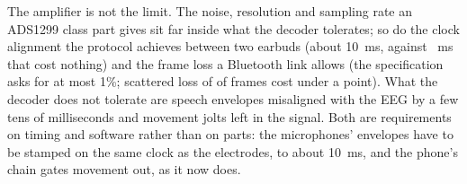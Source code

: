 The amplifier is not the limit. The noise, resolution and sampling rate an ADS1299 class part gives sit far inside what the decoder tolerates; so do the clock alignment the protocol achieves between two earbuds (about 10~ms, against \hwSkewHolds~ms that cost nothing) and the frame loss a Bluetooth link allows (the specification asks for at most 1\%; scattered loss of \hwLossHolds{} of frames cost under a point). What the decoder does not tolerate are speech envelopes misaligned with the EEG by a few tens of milliseconds and movement jolts left in the signal. Both are requirements on timing and software rather than on parts: the microphones' envelopes have to be stamped on the same clock as the electrodes, to about 10~ms, and the phone's chain gates movement out, as it now does.
